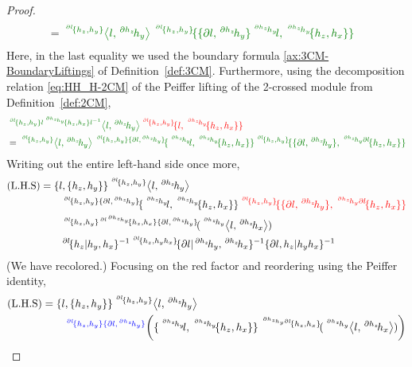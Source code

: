 \documentclass[11pt, reqno]{amsart} %
\newcommand{\act}[1]{\,\sp{#1}\!}
\newcommand{\red}[1]{\textcolor{red}{#1}}
\newcommand{\blue}[1]{\textcolor{blue}{#1}}
\newcommand{\green}[1]{\textcolor{green!50!black}{#1}}
\theoremstyle{definition}
\theoremstyle{remark}
\numberwithin{equation}{section}
\begin{document}
\begin{proof}
\begin{align*}
  &= \green{\act{\act{\partial l}\{h_z,h_y\}}\left<l,\act{\partial h_z}h_y\right>\act{\act{\partial l}\{h_z,h_y\}}\{\{\partial l,\act{\partial h_z}h_y\}\act{\act{\partial h_z}h_y}l,\act{\act{\partial h_z}h_y}\{h_z,h_x\}\}}
\end{align*}
Here, in the last equality we used the boundary formula \ref{ax:3CM-BoundaryLiftings} of Definition~\ref{def:3CM}. Furthermore, using the decomposition relation \eqref{eq:HH_H-2CM} of the Peiffer lifting of the 2-crossed module from Definition~\ref{def:2CM},
\begin{align*}
  &\green{\act{\act{\partial l}\{h_z,h_y\}l\act{\act{\partial h_z}h_y}\{h_z,h_x\}l^{-1}}\left<l,\act{\partial h_z}h_y\right>}\red{\act{\act{\partial l}\{h_z,h_y\}}\{l,\act{\act{\partial h_z}h_y}\{h_z,h_x\}\}} \\
  &= \green{\act{\act{\partial l}\{h_z,h_y\}}\left<l,\act{\partial h_z}h_y\right>\act{\act{\partial l}\{h_z,h_y\}\{\partial l,\act{\partial h_z}h_y\}}\{\act{\act{\partial h_z}h_y}l,\act{\act{\partial h_z}h_y}\{h_z,h_x\}\}\act{\act{\partial l}\{h_z,h_y\}}\{\{\partial l,\act{\partial h_z}h_y\},\act{\act{\partial h_z}h_y\partial l}\{h_z,h_x\}\}}
\end{align*}
Writing out the entire left-hand side once more,
\begin{align*}
  (\text{L.H.S}) &= \{l,\{h_z,h_y\}\}\act{\act{\partial l}\{h_z,h_y\}}\left<l,\act{\partial h_z}h_y\right> \\
  &\qquad \act{\act{\partial l}\{h_z,h_y\}\{\partial l,\act{\partial h_z}h_y\}}\{\act{\act{\partial h_z}h_y}l,\act{\act{\partial h_z}h_y}\{h_z,h_x\}\}\red{\act{\act{\partial l}\{h_z,h_y\}}\{\{\partial l,\act{\partial h_z}h_y\},\act{\act{\partial h_z}h_y\partial l}\{h_z,h_x\}\}} \\
  &\qquad \act{\act{\partial l}\{h_z,h_y\}\act{\partial l\act{\partial h_z}h_y}\{h_z,h_x\}\{\partial l,\act{\partial h_z}h_y\}}(\act{\act{\partial h_z}h_y}\left<l,\act{\partial h_z}h_x\right>) \\
  &\qquad \act{\partial l}\{h_z|h_y,h_x\}^{-1}\act{\act{\partial l}\{h_z,h_yh_x\}}\{\partial l|\act{\partial h_z}h_y,\act{\partial h_z}h_x\}^{-1}\{\partial l,h_z|h_yh_x\}^{-1}
\end{align*}
(We have recolored.) Focusing on the red factor and reordering using the Peiffer identity,
\begin{align*}
  (\text{L.H.S}) &= \{l,\{h_z,h_y\}\}\act{\act{\partial l}\{h_z,h_y\}}\left<l,\act{\partial h_z}h_y\right> \\
  &\qquad \act{\blue{\act{\partial l}\{h_z,h_y\}\{\partial l,\act{\partial h_z}h_y\}}}\left(\{\act{\act{\partial h_z}h_y}l,\act{\act{\partial h_z}h_y}\{h_z,h_x\}\}\act{\act{\act{\partial h_z}h_y\partial l}\{h_z,h_x\}}(\act{\act{\partial h_z}h_y}\left<l,\act{\partial h_z}h_x\right>)\right) \\

\end{align*}
\end{proof}
\end{document}
